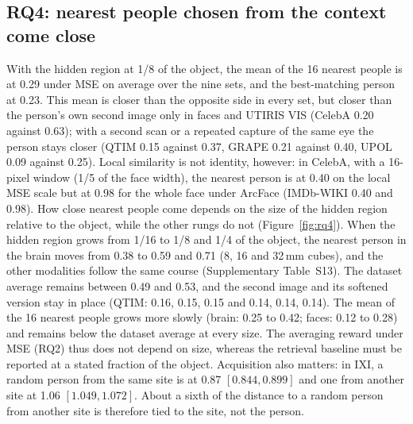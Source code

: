 \subsection{RQ4: nearest people chosen from the context come close}

With the hidden region at 1/8 of the object, the mean of the 16 nearest people is at 0.29 under \ac{MSE} on average over the nine sets, and the best-matching person at 0.23\statuspre.
This mean is closer than the opposite side in every set, but closer than the person's own second image only in faces and UTIRIS \ac{VIS} (CelebA 0.20 against 0.63); with a second scan or a repeated capture of the same eye the person stays closer (QTIM 0.15 against 0.37, GRAPE 0.21 against 0.40, UPOL 0.09 against 0.25)\statuspre.
Local similarity is not identity, however: in CelebA, with a 16-pixel window (1/5 of the face width), the nearest person is at 0.40 on the local \ac{MSE} scale but at 0.98 for the whole face under ArcFace\statusfinal{} (IMDb-WIKI 0.40 and 0.98\statusfinal).
How close nearest people come depends on the size of the hidden region relative to the object, while the other rungs do not (Figure~\ref{fig:rq4}).
When the hidden region grows from 1/16 to 1/8 and 1/4 of the object, the nearest person in the brain moves from 0.38 to 0.59 and 0.71 (8, 16 and 32\,mm cubes), and the other modalities follow the same course (Supplementary Table~S13)\statuspre.
The dataset average remains between 0.49 and 0.53, and the second image and its softened version stay in place (QTIM: 0.16, 0.15, 0.15 and 0.14, 0.14, 0.14).
The mean of the 16 nearest people grows more slowly (brain: 0.25 to 0.42; faces: 0.12 to 0.28) and remains below the dataset average at every size.
The averaging reward under \ac{MSE} (RQ2) thus does not depend on size, whereas the retrieval baseline must be reported at a stated fraction of the object.
Acquisition also matters: in IXI, a random person from the same site is at 0.87 $[0.844, 0.899]$ and one from another site at 1.06 $[1.049, 1.072]$\statuspre.
About a sixth of the distance to a random person from another site is therefore tied to the site, not the person.



